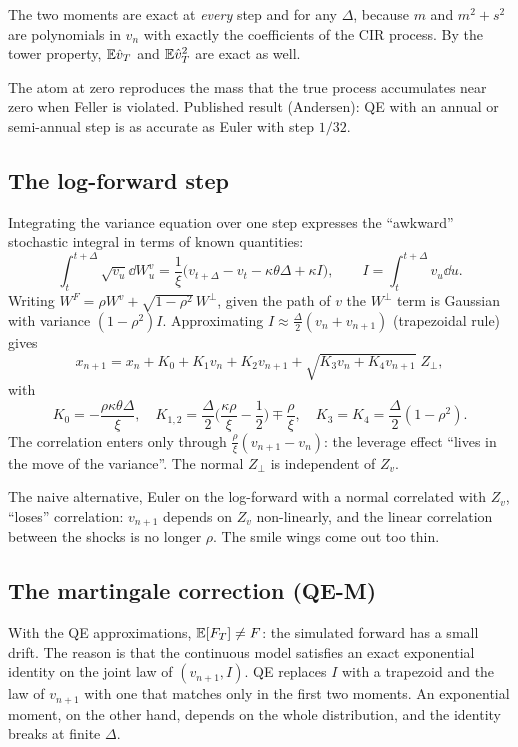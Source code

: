 \begin{perche}[title={Why QE is better than Euler}]
The two moments are exact at \emph{every} step and for any $\Delta$, because $m$ and $m^2+s^2$ are polynomials in
$v_n$ with exactly the coefficients of the CIR process. By the tower property, $\mathbb{E}\hat v_T$ and $\mathbb{E}\hat v_T^2$ are
exact as well.

The atom at zero reproduces the mass that the true process accumulates near zero when Feller is violated. Published
result (Andersen): QE with an annual or semi-annual step is as accurate as Euler with step $1/32$.
\end{perche}

\subsection{The log-forward step}
Integrating the variance equation over one step expresses the ``awkward'' stochastic integral in terms of known
quantities:
\[
\int_t^{t+\Delta}\!\sqrt{v_u}\dd W^v_u=\frac1\xi\Big(v_{t+\Delta}-v_t-\kappa\theta\Delta+\kappa I\Big),
\qquad I=\int_t^{t+\Delta}v_u\dd u .
\]
Writing $W^F=\rho W^v+\sqrt{1-\rho^2}\,W^\perp$, given the path of $v$ the $W^\perp$ term is Gaussian with variance
$(1-\rho^2)I$. Approximating $I\approx\tfrac\Delta2(v_n+v_{n+1})$ (trapezoidal rule) gives
\begin{equation}\label{eq:qe-x}
x_{n+1}=x_n+K_0+K_1v_n+K_2v_{n+1}+\sqrt{K_3v_n+K_4v_{n+1}}\;Z_\perp,
\end{equation}
with
\[
K_0=-\frac{\rho\kappa\theta\Delta}{\xi},\quad
K_{1,2}=\frac\Delta2\Big(\frac{\kappa\rho}{\xi}-\frac12\Big)\mp\frac\rho\xi,\quad
K_3=K_4=\frac\Delta2(1-\rho^2).
\]
The correlation enters only through $\frac\rho\xi(v_{n+1}-v_n)$: the leverage effect ``lives in the move of the
variance''. The normal $Z_\perp$ is independent of $Z_v$.

\begin{attenzione}
The naive alternative, Euler on the log-forward with a normal correlated with $Z_v$, ``loses'' correlation: $v_{n+1}$
depends on $Z_v$ non-linearly, and the linear correlation between the shocks is no longer $\rho$. The smile wings come
out too thin.
\end{attenzione}

\subsection{The martingale correction (QE-M)}
\label{sec:qe-m}
With the QE approximations, $\mathbb{E}[F_T]\ne F$: the simulated forward has a small drift. The reason is that the
continuous model satisfies an exact exponential identity on the joint law of $(v_{n+1},I)$. QE replaces $I$ with a
trapezoid and the law of $v_{n+1}$ with one that matches only in the first two moments. An exponential moment, on the
other hand, depends on the whole distribution, and the identity breaks at finite $\Delta$.

